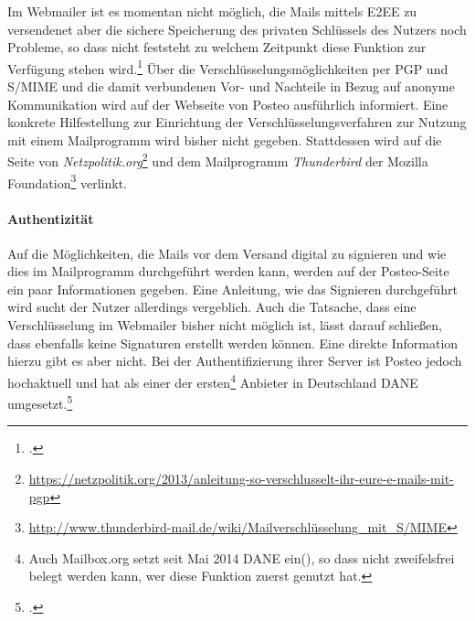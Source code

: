 \documentclass  [paper=a4,
				fontsize=12pt,
				listof=totoc,
				bibliography=totoc
				]{scrreprt}
\begin{document}
						Im Webmailer ist es momentan nicht möglich, die Mails mittels \ac{E2EE} zu versendenet aber die sichere Speicherung des privaten Schlüssels des Nutzers noch Probleme, so dass nicht feststeht zu welchem Zeitpunkt diese Funktion zur Verfügung stehen wird.\footcite[Vgl.][]{Posteo2013c}
						Über die Verschlüsselungsmöglichkeiten per \ac{PGP} und \ac{S/MIME} und die damit verbundenen Vor- und Nachteile in Bezug auf anonyme Kommunikation wird auf der Webseite von Posteo ausführlich informiert.
						Eine konkrete Hilfestellung zur Einrichtung der Verschlüsselungsverfahren zur Nutzung mit einem Mailprogramm wird bisher nicht gegeben.
						Stattdessen wird auf die Seite von \textit{Netzpolitik.org}\footnote{\url{https://netzpolitik.org/2013/anleitung-so-verschlusselt-ihr-eure-e-mails-mit-pgp}} und dem Mailprogramm \textit{Thunderbird} der Mozilla Foundation\footnote{\url{http://www.thunderbird-mail.de/wiki/Mailverschlüsselung_mit_S/MIME}} verlinkt.
					
					\paragraph{Authentizität}
						Auf die Möglichkeiten, die Mails vor dem Versand digital zu signieren und wie dies im Mailprogramm durchgeführt werden kann, werden auf der Posteo-Seite ein paar Informationen gegeben.
						Eine Anleitung, wie das Signieren durchgeführt wird sucht der Nutzer allerdings vergeblich.
						Auch die Tatsache, dass eine Verschlüsselung im Webmailer bisher nicht möglich ist, lässt darauf schließen, dass ebenfalls keine Signaturen erstellt werden können.
						Eine direkte Information hierzu gibt es aber nicht.
						Bei der Authentifizierung ihrer Server ist Posteo jedoch hochaktuell und hat als einer der ersten\footnote{Auch Mailbox.org setzt seit Mai 2014 \ac{DANE} ein(\cite[Vgl.][]{Mailbox2014a}), so dass nicht zweifelsfrei belegt werden kann, wer diese Funktion zuerst genutzt hat.} Anbieter in Deutschland \ac{DANE} umgesetzt.\footcite[Vgl.][]{Zivadino14e}\medskip\\
					
\end{document}
